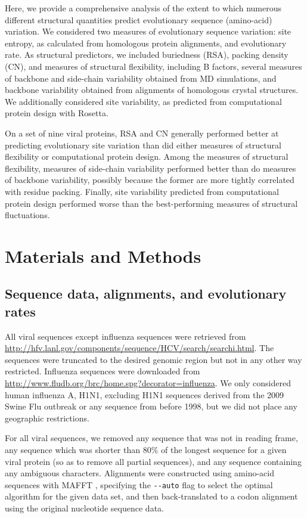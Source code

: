 \documentclass[smallextended]{svjour3}
\begin{document}
Here, we provide a comprehensive analysis of the extent to which numerous different structural quantities predict evolutionary sequence (amino-acid) variation. We considered two measures of evolutionary sequence variation: site entropy, as calculated from homologous protein alignments, and evolutionary rate. As structural predictors, we included buriedness (RSA), packing density (CN), and measures of structural flexibility, including B factors, several measures of backbone and side-chain variability obtained from MD simulations, and backbone variability obtained from alignments of homologous crystal structures. We additionally considered site variability, as predicted from computational protein design with Rosetta.

On a set of nine viral proteins, RSA and CN generally performed better at predicting evolutionary site variation than did either measures of structural flexibility or computational protein design. Among the measures of structural flexibility, measures of side-chain variability performed better than do measures of backbone variability, possibly because the former are more tightly correlated with residue packing. Finally, site variability predicted from computational protein design performed worse than the best-performing measures of structural fluctuations.

\section*{Materials and Methods}

\subsection*{Sequence data, alignments, and evolutionary rates}

All viral sequences except influenza sequences were retrieved from \url{http://hfv.lanl.gov/components/sequence/HCV/search/searchi.html}.
The sequences were truncated to the desired genomic region but not in any other way restricted. Influenza sequences were downloaded from \url{http://www.fludb.org/brc/home.spg?decorator=influenza}. We only considered human influenza A, H1N1, excluding H1N1 sequences derived from the 2009 Swine Flu outbreak or any sequence from before 1998, but we did not place any geographic restrictions.

For all viral sequences, we removed any sequence that was not in reading frame, any sequence which was shorter than 80\% of the longest sequence for a given viral protein (so as to remove all partial sequences), and any sequence containing any ambiguous characters. Alignments were constructed using amino-acid sequences with MAFFT \citep{Katohetal2002,Katohetal2005}, specifying the \verb+--auto+ flag to select the optimal algorithm for the given data set, and then back-translated to a codon alignment using the original nucleotide sequence data.
\end{document}

